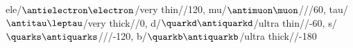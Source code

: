 ele/$\antielectron\electron$/very thin//120,
mu/$\antimuon\muon$///60,
tau/$\antitau\leptau$/very thick//0,
d/$\quarkd\antiquarkd$/ultra thin//-60,
s/$\quarks\antiquarks$///-120,
b/$\quarkb\antiquarkb$/ultra thick//-180
